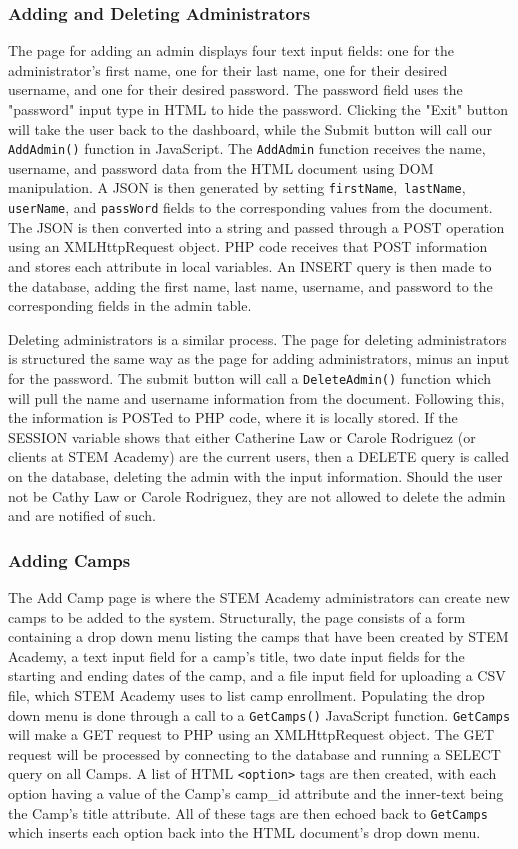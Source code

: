 \documentclass[letterpaper,10pt,serif,draftclsnofoot,onecolumn,compsoc,titlepage]{IEEEtran}
\begin{document}
\subsubsection{Adding and Deleting Administrators}
The page for adding an admin displays four text input fields: one for the administrator's first name, one for their last name, one for their desired username, and one for their desired password.
The password field uses the "password" input type in HTML to hide the password.
Clicking the "Exit" button will take the user back to the dashboard, while the Submit button will call our \texttt{AddAdmin()} function in JavaScript.
The \texttt{AddAdmin} function receives the name, username, and password data from the HTML document using DOM manipulation.
A JSON is then generated by setting \texttt{firstName},\texttt{ lastName}, \texttt{userName}, and \texttt{passWord} fields to the corresponding values from the document.
The JSON is then converted into a string and passed through a POST operation using an XMLHttpRequest object.
PHP code receives that POST information and stores each attribute in local variables.
An INSERT query is then made to the database, adding the first name, last name, username, and password to the corresponding fields in the admin table.

Deleting administrators is a similar process.
The page for deleting administrators is structured the same way as the page for adding administrators, minus an input for the password.
The submit button will call a \texttt{DeleteAdmin()} function which will pull the name and username information from the document.
Following this, the information is POSTed to PHP code, where it is locally stored.
If the SESSION variable shows that either Catherine Law or Carole Rodriguez (or clients at STEM Academy) are the current users, then a DELETE query is called on the database, deleting the admin with the input information.
Should the user not be Cathy Law or Carole Rodriguez, they are not allowed to delete the admin and are notified of such.
\subsubsection{Adding Camps}
The Add Camp page is where the STEM Academy administrators can create new camps to be added to the system.
Structurally, the page consists of a form containing a drop down menu listing the camps that have been created by STEM Academy, a text input field for a camp's title, two date input fields for the starting and ending dates of the camp, and a file input field for uploading a CSV file, which STEM Academy uses to list camp enrollment.
Populating the drop down menu is done through a call to a \texttt{GetCamps()} JavaScript function.
\texttt{GetCamps} will make a GET request to PHP using an XMLHttpRequest object.
The GET request will be processed by connecting to the database and running a SELECT query on all Camps.
A list of HTML \texttt{<option>} tags are then created, with each option having a value of the Camp's camp\_id attribute and the inner-text being the Camp's title attribute.
All of these tags are then echoed back to \texttt{GetCamps} which inserts each option back into the HTML document's drop down menu.
\end{document}
